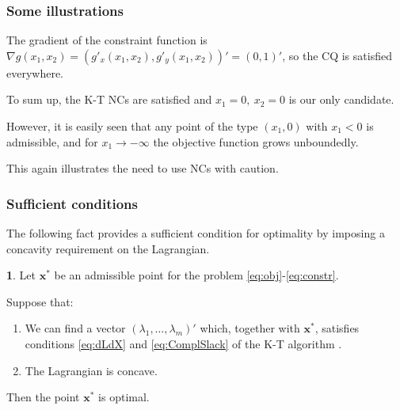 \documentclass[10pt]{beamer}
\theoremstyle{definition}
\newtheorem{Fact}{\translate{Fact}}
\begin{document}
\begin{frame}[fragile]
\frametitle{Some illustrations}\addtocounter{theorem}{-1}
\begin{example}[cont.]
The gradient of the constraint function is $\nabla g(x_1,x_2) = (g'_x(x_1,x_2),g'_y(x_1,x_2))' = (0,1)' $, so the CQ is satisfied everywhere. \bigskip

To sum up, the K-T NCs are satisfied and $ x_1=0,~x_2=0 $ is our only candidate.\bigskip

However, it is easily seen that any point of the type $ (x_1,0) $ with $ x_1<0 $ is admissible, and for $ x_1 \rightarrow -\infty $ the objective function grows unboundedly. 

This again illustrates the need to use NCs with caution. 
\end{example}
\end{frame}


\begin{frame}[fragile]
\frametitle{Sufficient conditions}
The following fact provides a sufficient condition for optimality by imposing a concavity requirement on the Lagrangian.

\begin{Fact}
Let $ \mathbf{x^*} $ be an admissible point for the problem \eqref{eq:obj}-\eqref{eq:constr}. 

Suppose that:\begin{enumerate}
\item We can find a vector $ (\lambda_1,\ldots,\lambda_m)' $ which, together with $ \mathbf{x^*} $, satisfies conditions \eqref{eq:dLdX} and \eqref{eq:ComplSlack} of the K-T algorithm .
\item The Lagrangian is concave.
\end{enumerate}

Then the point $ \mathbf{x^*} $ is optimal.
\label{fc:SCsIneq}
\end{Fact}
\end{frame}
\end{document}
